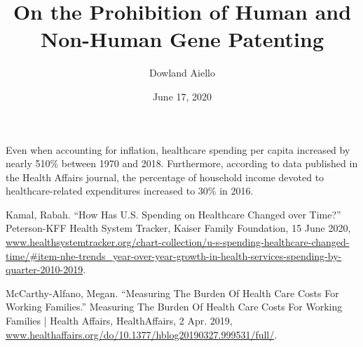 \documentclass{article}
\begin{document}
\title{On the Prohibition of Human and Non-Human Gene Patenting}
\author{Dowland Aiello}
\date{June 17, 2020}

\maketitle
\tableofcontents
\fancyhf{}

\newpage

Even when accounting for inflation, healthcare spending per capita increased by
nearly 510\% between 1970 and 2018\cite{healthcare_spending}. Furthermore,
according to data published in the Health Affairs journal, the percentage of
household income devoted to healthcare-related expenditures increased to 30\% in
2016\cite{healthaffairs}.

\begin{thebibliography}{2}
	Kamal, Rabah. “How Has U.S. Spending on Healthcare Changed over Time?” Peterson-KFF Health System Tracker, Kaiser Family Foundation, 15 June 2020, \href{www.healthsystemtracker.org/chart-collection/u-s-spending-healthcare-changed-time/\#item-nhe-trends_year-over-year-growth-in-health-services-spending-by-quarter-2010-2019}{www.healthsystemtracker.org/chart-collection/u-s-spending-healthcare-changed-time/\#item-nhe-trends\_year-over-year-growth-in-health-services-spending-by-quarter-2010-2019}.

	McCarthy-Alfano, Megan. “Measuring The Burden Of Health Care Costs For Working Families.” Measuring The Burden Of Health Care Costs For Working Families | Health Affairs, HealthAffairs, 2 Apr. 2019, \href{www.healthaffairs.org/do/10.1377/hblog20190327.999531/full/}{www.healthaffairs.org/do/10.1377/hblog20190327.999531/full/}.
\end{thebibliography}
\end{document}
